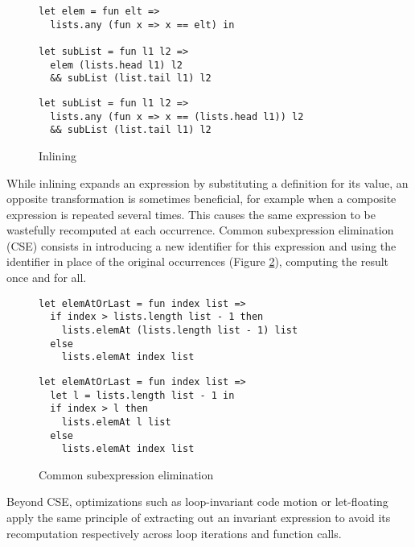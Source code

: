 \documentclass[sigplan,10pt,review,anonymous]{acmart}
\begin{document}
\begin{figure}[h]
  \begin{center}
\begin{lstlisting}[language=nickel,title={Source program}]
let elem = fun elt =>
  lists.any (fun x => x == elt) in

let subList = fun l1 l2 =>
  elem (lists.head l1) l2
  && subList (list.tail l1) l2
\end{lstlisting}
\begin{lstlisting}[language=nickel,title={Optimized program}]
let subList = fun l1 l2 =>
  lists.any (fun x => x == (lists.head l1)) l2
  && subList (list.tail l1) l2
\end{lstlisting}
  \end{center}
\caption{Inlining}
\label{fig:optimizations-inlining-ex}
\end{figure}

While inlining expands an expression by substituting a definition for its value,
an opposite transformation is sometimes beneficial, for example when a composite
expression is repeated several times. This causes the same expression to be
wastefully recomputed at each occurrence. Common subexpression elimination (CSE)
consists in introducing a new identifier for this expression and using the
identifier in place of the original occurrences
(Figure \ref{fig:optimizations-cse-ex}), computing the result once and for all.

\begin{figure}[h]
  \begin{center}
\begin{lstlisting}[language=nickel,title={Source program}]
let elemAtOrLast = fun index list =>
  if index > lists.length list - 1 then
    lists.elemAt (lists.length list - 1) list
  else
    lists.elemAt index list
\end{lstlisting}
\begin{lstlisting}[language=nickel,title={Optimized program}]
let elemAtOrLast = fun index list =>
  let l = lists.length list - 1 in
  if index > l then
    lists.elemAt l list
  else
    lists.elemAt index list
\end{lstlisting}
  \end{center}
\caption{Common subexpression elimination}
\label{fig:optimizations-cse-ex}
\end{figure}

Beyond CSE, optimizations such as loop-invariant code motion or
let-floating~\cite{letFloating} apply the same principle of extracting out an invariant
expression to avoid its recomputation respectively across loop iterations and
function calls.
\end{document}
